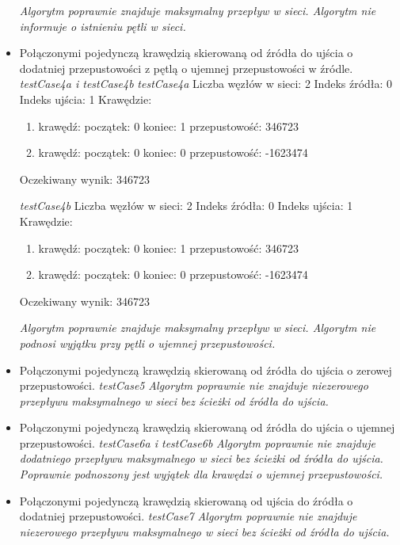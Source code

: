 \begin{itemize}[nosep]
    \emph{Algorytm poprawnie znajduje maksymalny przepływ
w sieci. Algorytm nie informuje o istnieniu pętli w sieci.}

    \item Połączonymi pojedynczą krawędzią skierowaną od źródła do ujścia o dodatniej przepustowości z pętlą o ujemnej przepustowości w źródle.
    \emph{testCase4a i testCase4b}
    \emph{testCase4a}
    Liczba węzłów w sieci: 2
    Indeks źródła: 0
    Indeks ujścia: 1
    Krawędzie:
    \begin{enumerate}[nosep]
        \item krawędź:
        początek: 0
        koniec: 1
        przepustowość: 346723
        \item krawędź:
        początek: 0
        koniec: 0
        przepustowość: -1623474
    \end{enumerate}
    Oczekiwany wynik: 346723

    \emph{testCase4b}
    Liczba węzłów w sieci: 2
    Indeks źródła: 0
    Indeks ujścia: 1
    Krawędzie:
    \begin{enumerate}[nosep]
        \item krawędź:
        początek: 0
        koniec: 1
        przepustowość: 346723
        \item krawędź:
        początek: 0
        koniec: 0
        przepustowość: -1623474
    \end{enumerate}
    Oczekiwany wynik: 346723

    \emph{Algorytm poprawnie znajduje maksymalny przepływ
    w sieci. Algorytm nie podnosi wyjątku przy pętli o ujemnej przepustowości.}

    \item Połączonymi pojedynczą krawędzią skierowaną od źródła do ujścia o zerowej przepustowości.
    \emph{testCase5}
    \emph{Algorytm poprawnie nie znajduje niezerowego przepływu
    maksymalnego w sieci bez ścieżki od źródła do ujścia.}

    \item Połączonymi pojedynczą krawędzią skierowaną od źródła do ujścia o ujemnej przepustowości.
    \emph{testCase6a i testCase6b}
    \emph{Algorytm poprawnie nie znajduje
    dodatniego przepływu maksymalnego w sieci bez ścieżki od źródła do ujścia. Poprawnie
    podnoszony jest wyjątek dla krawędzi o ujemnej przepustowości.}

    \item Połączonymi pojedynczą krawędzią skierowaną od ujścia do źródła o dodatniej przepustowości.
    \emph{testCase7}
    \emph{Algorytm poprawnie nie znajduje niezerowego
    przepływu maksymalnego w sieci bez ścieżki od źródła do ujścia.}


\end{itemize}
